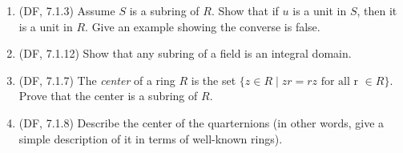 \documentclass{amsart}
\theoremstyle{definition}
\begin{document}
\begin{enumerate}
  \begin{enumerate}
  \item (DF, 7.1.3) Assume $S$ is a subring of $R$. Show that if $u$ is a unit in $S$, then it is a unit in $R$. Give an example showing the converse is false.
  \item (DF, 7.1.12) Show that any subring of a field is an integral domain.
  \item (DF, 7.1.7) The \emph{center} of a ring $R$ is the set $\{z \in R \mid zr = rz \text{ for all r } \in R\}$. Prove that the center is a subring of $R$.
  \item (DF, 7.1.8) Describe the center of the quarternions (in other words, give a simple description of it in terms of well-known rings).
  \end{enumerate}
\end{enumerate}
\end{document}

